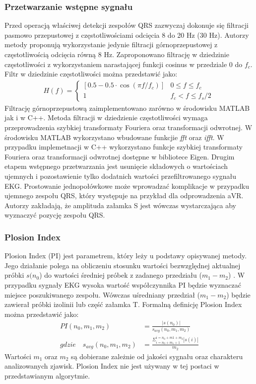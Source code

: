 \documentclass[10pt,a4paper]{article}
\begin{document}
\subsubsection{Przetwarzanie wstępne sygnału}
Przed operacją właściwej detekcji zespołów QRS zazwyczaj dokonuje się filtracji pasmowo przepustowej z częstotliwościami odcięcia 8 do 20 Hz (30 Hz). Autorzy metody proponują wykorzystanie jedynie filtracji górnoprzepustowej z częstotliwością odcięcia równą 8 Hz. Zaproponowano filtrację w dziedzinie częstotliwości z wykorzystaniem narastającej funkcji cosinus w przedziale $0$ do $f_c$. Filtr w dziedzinie częstotliwości można przedstawić jako:
\begin{align}
 H(f) =
 \begin{cases}
 [0.5-0.5\cdot\cos(\pi f/f_c)]  &0\leq f \leq f_c    \\
 1 &  f_c < f \leq f_s/2
\end{cases}\
\end{align}
Filtrację górnoprzepustową zaimplementowano zarówno w środowisku MATLAB jak i w C++. Metoda filtracji w dziedzienie częstotliwości wymaga przeprowadzenia szybkiej transformaty Fouriera oraz transformacji odwrotnej. W środowisku MATLAB wykorzystano wbudowane funkcjie \textit{fft} oraz \textit{ifft}. W przypadku implemetnacji w C++ wykorzystano funkcje szybkiej transformaty Fouriera oraz transformacji odwrotnej dostępne w bibliotece Eigen. Drugim etapem wstępnego przetwarzania jest usunięcie składowych o wartościach ujemnych i pozostawienie tylko dodatnich wartości przefiltrowanego sygnału EKG. Prostowanie jednopołówkowe może wprowadzać komplikacje w przypadku ujemnego zespołu QRS, który występuje na przykład dla odprowadzenia aVR. Autorzy zakładają, że amplituda załamka S jest wówczas wystarczająca aby wyznaczyć pozycję zespołu QRS. 

\subsubsection{Plosion Index}
Plosion Index (PI) jest parametrem, który leży u podstawy opisywanej metody. Jego działanie polega na obliczeniu stosunku wartości bezwzględnej aktualnej próbki $s(n_0$) do wartości średniej próbek z zadanego przedziału ($m_1 - m_2$) \cite{dpi}. W przypadku sygnały EKG wysoka wartość współczynnika PI będzie wyznaczać miejsce poszukiwanego zespołu. Wówczas uśredniany przedział ($m_1 - m_2$) będzie zawierał próbki izolinii lub część załamka T. Formalną definicję Plosion Index można przedstawić jako:
\begin{align}
	PI(n_0,m_1,m_2) &= \frac{|s(n_0)|}{s_{avg}(n_0,m_1,m_2)} \\
	gdzie \quad s_{avg}(n_0,m_1,m_2) &= \frac{\Sigma_{i=n_0+m_1+1}^{i=n_0+m1+m_2}|s(i)|}{m_2}
\end{align}
Wartości $m_1$ oraz $m_2$ są dobierane zależnie od jakości sygnału oraz charakteru analizowanych zjawisk.
Plosion Index nie jest używany w tej postaci w przedstawianym algorytmie.
\end{document}
